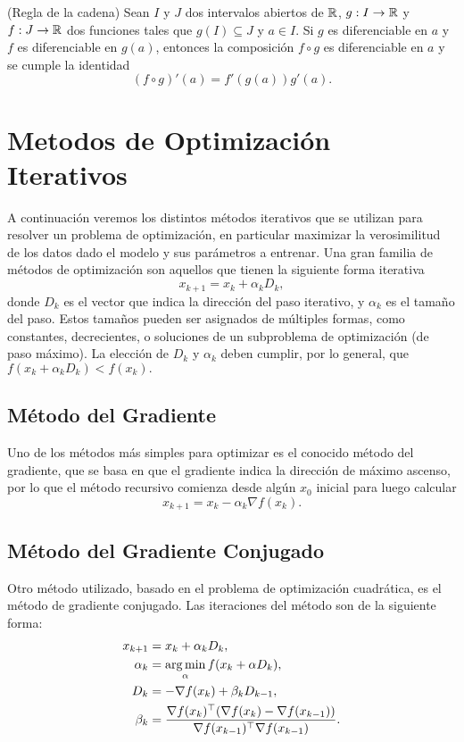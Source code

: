 \begin{theorem}
	(Regla de la cadena) Sean \(I\) y \(J\) dos intervalos abiertos de \(\mathbb{R}\), \(g:I\to\mathbb{R}\) y \(f:J\to\mathbb{R}\) dos funciones tales que \(g(I)\subseteq J\) y \(a \in I\). Si \(g\) es diferenciable en \(a\) y \(f\) es diferenciable en \(g(a)\), entonces la composición \(f \circ g\) es diferenciable en \(a\) y se cumple la identidad \[(f \circ g)'(a) = f'(g(a))g'(a).\]
\end{theorem}

\section{Metodos de Optimización Iterativos}
A continuación veremos los distintos métodos iterativos que se utilizan para resolver un problema de optimización, en particular maximizar la verosimilitud de los datos dado el modelo y sus parámetros a entrenar. Una gran familia de métodos de optimización son aquellos que tienen la siguiente forma iterativa
\[x_{k+1} = x_k + \alpha_k D_{k},\]
donde \(D_k\) es el vector que indica la dirección del paso iterativo, y \(\alpha_k\) es el tamaño del paso. Estos tamaños pueden ser asignados de múltiples formas, como constantes, decrecientes, o soluciones de un subproblema de optimización (de paso máximo). La elección de \(D_k\) y \(\alpha_k\) deben cumplir, por lo general, que \(f(x_k + \alpha_k D_{k}) < f(x_k).\)


\subsection{Método del Gradiente}

Uno de los métodos más simples para optimizar es el conocido método del gradiente, que se basa en que el gradiente indica la dirección de máximo ascenso, por lo que el método recursivo comienza desde algún \(x_0\) inicial para luego calcular
\[x_{k+1} = x_k - \alpha_k \nabla f(x_k).\]

\subsection{Método del Gradiente Conjugado}

Otro método utilizado, basado en el problema de optimización cuadrática, es el método de gradiente conjugado. Las iteraciones del método son de la siguiente forma:
\begin{align*}
x_{k+1}		&= x_k + \alpha_k D_k, \\
\alpha_k	&= \operatorname*{\arg\min}_{\alpha} f(x_k + \alpha D_k),\\
D_k			&= -\nabla f(x_k) + \beta_k D_{k-1}, \\
\beta_k		&= \frac{\nabla f(x_k)^{\top} (\nabla f(x_k) - \nabla f(x_{k-1}))}{\nabla f(x_{k-1})^{\top} \nabla f(x_{k-1})}.
\end{align*}

